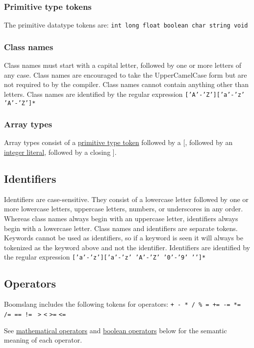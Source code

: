 \documentclass{article}
\begin{document}
\subsubsection{Primitive type tokens}
\label{sec:primitivetypetokens}
The primitive datatype tokens are: \texttt{int long float boolean char string void}

\subsubsection{Class names}
Class names must start with a capital letter, followed by one or more letters of any case. Class names are encouraged to take the UpperCamelCase form but are not required to by the compiler. Class names cannot contain anything other than letters. Class names are identified by the regular expression \texttt{['A'-'Z']['a'-'z' 'A'-'Z']*}

\subsubsection{Array types}
Array types consist of a \hyperref[sec:primitivetypetokens]{primitive type token} followed by a [, followed by an \hyperref[sec:intliterals]{integer literal}, followed by a closing ].

\subsection{Identifiers}
Identifiers are case-sensitive. They consist of a lowercase letter followed by one or more lowercase letters, uppercase letters, numbers, or underscores in any order. Whereas class names always begin with an uppercase letter, identifiers always begin with a lowercase letter. Class names and identifiers are separate tokens. Keywords cannot be used as identifiers, so if a keyword is seen it will always be tokenized as the keyword above and not the identifier. Identifiers are identified by the regular expression \texttt{['a'-'z']['a'-'z' 'A'-'Z' '0'-'9' '\textunderscore']*}

\subsection{Operators}
Boomslang includes the following tokens for operators: \texttt{+ - * / \% = += -= *= /= == != } \texttt{>} \texttt{<} \texttt{>=} \texttt{<=}

See \hyperref[sec:expr-mathematical-operators]{mathematical operators} and \hyperref[sec:expr-boolean-operators]{boolean operators} below for the semantic meaning of each operator.
\end{document}
